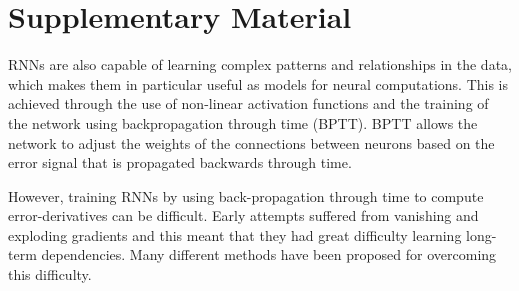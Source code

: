 \documentclass{article}
\newcounter{ct}
\theoremstyle{definition}
\theoremstyle{remark}
\begin{document}
\small

\newpage



\newpage
\section{Supplementary Material}

RNNs are also capable of learning complex patterns and relationships in the data, which makes them in particular useful as models for neural computations. This is achieved through the use of non-linear activation functions and the training of the network using backpropagation through time (BPTT).
BPTT allows the network to adjust the weights of the connections between neurons based on the error signal that is propagated backwards through time. 

However, training RNNs by using back-propagation through time to compute error-derivatives can be difficult.  Early attempts suffered from vanishing and exploding gradients \citep{kolen2001} and this meant that they had great difficulty learning long-term dependencies. 
Many different methods have been proposed for overcoming this difficulty.
\end{document}
